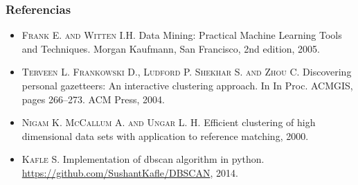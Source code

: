 \documentclass[10pt, spanish]{beamer}
\begin{document}
\begin{frame}[fragile]
\frametitle{Referencias}
\begin{itemize}
\item \textsc{Frank E. and Witten I.H.} Data Mining: Practical Machine Learning Tools and Techniques. Morgan Kaufmann, San Francisco, 2nd edition, 2005.

\item \textsc{Terveen L. Frankowski D., Ludford P. Shekhar S. and Zhou C.} Discovering personal gazetteers: An interactive clustering approach. In In Proc. ACMGIS, pages 266–273. ACM Press, 2004.

\item \textsc{Nigam K. McCallum A. and Ungar L. H.} Efficient clustering of high dimensional data sets with application to reference matching, 2000.

\item \textsc{Kafle S.} Implementation of dbscan algorithm in python. \href{https://github.com/SushantKafle/DBSCAN, 2014.}{https://github.com/SushantKafle/DBSCAN}, 2014.


\end{itemize}

\end{frame}

\end{document}
